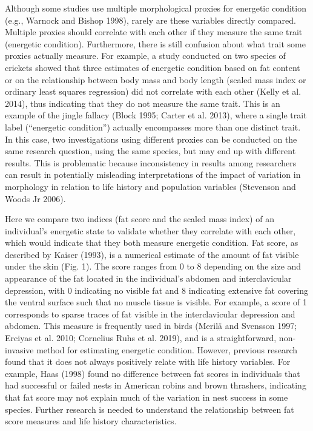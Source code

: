 \documentclass[
]{article}
\begin{document}
Although some studies use multiple morphological proxies for energetic
condition (e.g., Warnock and Bishop 1998), rarely are these variables
directly compared. Multiple proxies should correlate with each other if
they measure the same trait (energetic condition). Furthermore, there is
still confusion about what trait some proxies actually measure. For
example, a study conducted on two species of crickets showed that three
estimates of energetic condition based on fat content or on the
relationship between body mass and body length (scaled mass index or
ordinary least squares regression) did not correlate with each other
(Kelly et al. 2014), thus indicating that they do not measure the same
trait. This is an example of the jingle fallacy (Block 1995; Carter et
al. 2013), where a single trait label (``energetic condition'') actually
encompasses more than one distinct trait. In this case, two
investigations using different proxies can be conducted on the same
research question, using the same species, but may end up with different
results. This is problematic because inconsistency in results among
researchers can result in potentially misleading interpretations of the
impact of variation in morphology in relation to life history and
population variables (Stevenson and Woods Jr 2006).

Here we compare two indices (fat score and the scaled mass index) of an
individual's energetic state to validate whether they correlate with
each other, which would indicate that they both measure energetic
condition. Fat score, as described by Kaiser (1993), is a numerical
estimate of the amount of fat visible under the skin (Fig. 1). The score
ranges from 0 to 8 depending on the size and appearance of the fat
located in the individual's abdomen and interclavicular depression, with
0 indicating no visible fat and 8 indicating extensive fat covering the
ventral surface such that no muscle tissue is visible. For example, a
score of 1 corresponds to sparse traces of fat visible in the
interclavicular depression and abdomen. This measure is frequently used
in birds (Merilä and Svensson 1997; Erciyas et al. 2010; Cornelius Ruhs
et al. 2019), and is a straightforward, non-invasive method for
estimating energetic condition. However, previous research found that it
does not always positively relate with life history variables. For
example, Haas (1998) found no difference between fat scores in
individuals that had successful or failed nests in American robins and
brown thrashers, indicating that fat score may not explain much of the
variation in nest success in some species. Further research is needed to
understand the relationship between fat score measures and life history
characteristics.
\end{document}
